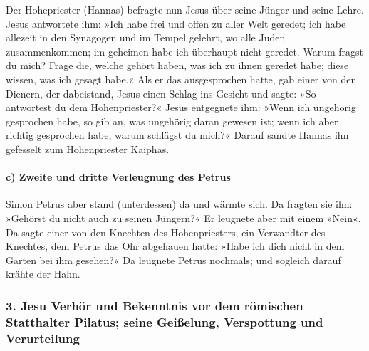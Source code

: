  Der Hohepriester (Hannas) befragte nun Jesus über seine
Jünger und seine Lehre.  Jesus antwortete ihm: »Ich habe
frei und offen zu aller Welt geredet; ich habe allezeit in den Synagogen
und im Tempel gelehrt, wo alle Juden zusammenkommen; im geheimen habe
ich überhaupt nicht geredet.  Warum fragst du mich? Frage
die, welche gehört haben, was ich zu ihnen geredet habe; diese wissen,
was ich gesagt habe.«  Als er das ausgesprochen hatte,
gab einer von den Dienern, der dabeistand, Jesus einen Schlag ins
Gesicht und sagte: »So antwortest du dem Hohenpriester?« 
Jesus entgegnete ihm: »Wenn ich ungehörig gesprochen habe, so gib an,
was ungehörig daran gewesen ist; wenn ich aber richtig gesprochen habe,
warum schlägst du mich?«  Darauf sandte Hannas ihn
gefesselt zum Hohenpriester Kaiphas.

\hypertarget{c-zweite-und-dritte-verleugnung-des-petrus}{%
\paragraph{c) Zweite und dritte Verleugnung des
Petrus}\label{c-zweite-und-dritte-verleugnung-des-petrus}}

 Simon Petrus aber stand (unterdessen) da und wärmte
sich. Da fragten sie ihn: »Gehörst du nicht auch zu seinen Jüngern?«
 Er leugnete aber mit einem »Nein«. Da sagte einer von
den Knechten des Hohenpriesters, ein Verwandter des Knechtes, dem Petrus
das Ohr abgehauen hatte: »Habe ich dich nicht in dem Garten bei ihm
gesehen?«  Da leugnete Petrus nochmals; und sogleich
darauf krähte der Hahn.

\hypertarget{jesu-verhuxf6r-und-bekenntnis-vor-dem-ruxf6mischen-statthalter-pilatus-seine-geiuxdfelung-verspottung-und-verurteilung}{%
\subsubsection{3. Jesu Verhör und Bekenntnis vor dem römischen
Statthalter Pilatus; seine Geißelung, Verspottung und
Verurteilung}\label{jesu-verhuxf6r-und-bekenntnis-vor-dem-ruxf6mischen-statthalter-pilatus-seine-geiuxdfelung-verspottung-und-verurteilung}}

